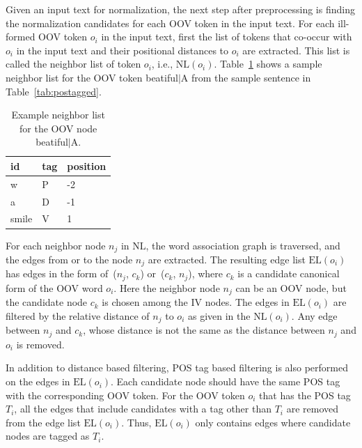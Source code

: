 \documentclass[a4paper,onesided,12pt]{report}
\begin{document}
Given an input text for normalization, the next step after preprocessing is finding the normalization candidates for each OOV token in the input text. For each ill-formed OOV token $o_i$ in the input text, first the list of tokens that co-occur with $o_i$ in the input text and their positional distances to $o_i$ are extracted.  This list is called the neighbor list of token $o_i$, i.e.,  $\text{NL}(o_i)$. Table~\ref{tab:neigh} shows a sample neighbor list for the OOV token beatiful$|$A from the sample sentence in Table~\ref{tab:postagged}.

\begin{table}[hbt]
\caption{Example neighbor list for the OOV node beatiful$|$A.}
\centering
\begin{tabular}{|l|l|l|}
    \hline
    \textbf{id} & \textbf{tag} & \textbf{position} \\
    \hline
    w & P & -2 \\     \hline
    a & D & -1 \\     \hline
    smile & V & 1 \\     \hline
  \end{tabular}
\label{tab:neigh}
\end{table}

For each neighbor node $n_{j}$ in $\text{NL}$, the word association graph is traversed, and the edges from or to the node $n_{j}$ are extracted. The resulting edge list $\text{EL}(o_i)$ has edges in the form of~($n_{j}$, $c_{k}$) or~($c_{k}$, $n_{j}$), where $c_{k}$ is a candidate canonical form of the OOV word $o_i$.
Here the neighbor node $n_{j}$ can be an OOV node, but the candidate node $c_{k}$ is chosen among the IV nodes.
The edges in $\text{EL}(o_i)$ are filtered by the relative distance of $n_{j}$ to $o_i$ as given in the $\text{NL}(o_i)$. Any edge between  $n_{j}$ and $c_{k}$, whose distance is not the same as the distance between $n_{j}$ and $o_i$ is removed.

In addition to distance based filtering, POS tag based filtering is also performed on the edges in $\text{EL}(o_i)$. Each candidate node should have the same POS tag with the corresponding OOV token. For the OOV token $o_i$ that has the POS tag $T_i$, all the edges that include candidates with a tag other than $T_i$ are removed from the edge list $\text{EL}(o_{i})$. Thus, $\text{EL}(o_{i})$ only contains edges where candidate nodes are tagged as $T_i$.
\end{document}
